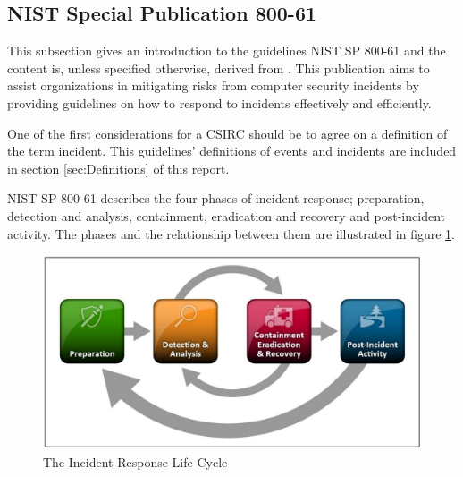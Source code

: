 \subsection{\acs{NIST} Special Publication 800-61}
This subsection gives an introduction to the guidelines \acs{NIST} SP 800-61 and the content is, unless specified otherwise, derived from \cite{nist800-61}. This publication aims to  assist organizations in mitigating risks from computer security incidents by providing guidelines on how to respond to incidents effectively and efficiently. 

One of the first considerations for a \ac{CSIRC} should be to agree on a definition of the term incident. This guidelines' definitions of events and incidents are included in section \ref{sec:Definitions} of this report. 

\acs{NIST} SP 800-61 describes the four phases of incident response; preparation, detection and analysis, containment, eradication and recovery and post-incident activity. The phases and the relationship between them are illustrated in figure \ref{fig:NISTIncidentResponse}.

\begin{figure}[ht]
\begin{center}
\includegraphics[scale=0.27]{NISTIncidentResponseCycle.png}
\caption[The Incident Response Life Cycle]{The Incident Response Life Cycle \cite{nist800-61}}
\label{fig:NISTIncidentResponse}
\end{center}
\end{figure}

